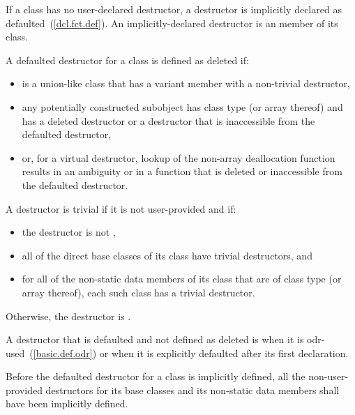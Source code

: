 \pnum
{}%
%
%
If a class has no user-declared
destructor, a destructor is implicitly
declared as defaulted~(\ref{dcl.fct.def}).
An implicitly-declared destructor is an
member of its class.

\pnum
A defaulted destructor for a class
   is defined as deleted if:
\begin{itemize}
\item {} is a union-like class that has a variant
  member with a non-trivial destructor,

\item any potentially constructed subobject has class type
   (or array thereof) and
   has a deleted destructor or a destructor
  that is inaccessible from the defaulted destructor,

\item or, for a virtual destructor, lookup of the non-array deallocation
  function results in an ambiguity or in a function that is deleted or
  inaccessible from the defaulted destructor.
\end{itemize}

A destructor is trivial if it is not user-provided and if:

\begin{itemize}
\item the destructor is not ,

\item all of the direct base classes of its class have trivial destructors, and

\item for all of the non-static data members of its class that are of class
type (or array thereof), each such class has a trivial destructor.
\end{itemize}

Otherwise, the destructor is
.

\pnum
{}%
A destructor
that is defaulted and not defined as deleted
is
when it is odr-used~(\ref{basic.def.odr})
or when it is explicitly defaulted after its first declaration.

\pnum
Before the
defaulted destructor for a class is implicitly defined, all the non-user-provided
destructors for its base classes and its non-static data members shall have been
implicitly defined.


